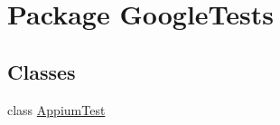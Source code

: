 \hypertarget{namespace_google_tests}{\section{Package Google\-Tests}
\label{namespace_google_tests}
}
\subsection*{Classes}
\begin{DoxyCompactItemize}
\item 
class \hyperlink{class_google_tests_1_1_appium_test}{Appium\-Test}
\end{DoxyCompactItemize}
